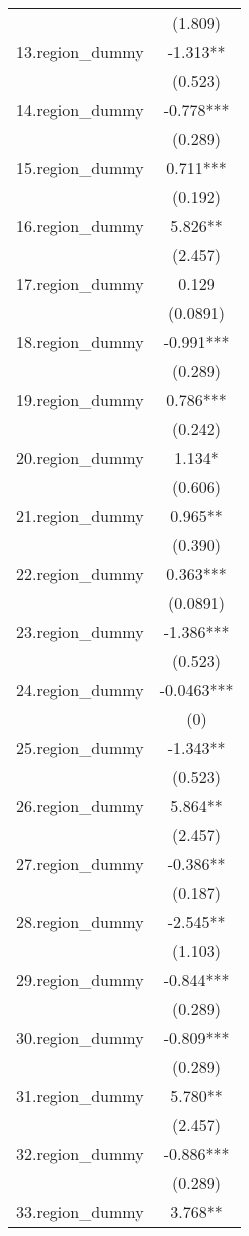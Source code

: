\documentclass[]{article}
\begin{document}
\begin{tabular}{lc}
 & (1.809) \\
13.region\_dummy & -1.313** \\
 & (0.523) \\
14.region\_dummy & -0.778*** \\
 & (0.289) \\
15.region\_dummy & 0.711*** \\
 & (0.192) \\
16.region\_dummy & 5.826** \\
 & (2.457) \\
17.region\_dummy & 0.129 \\
 & (0.0891) \\
18.region\_dummy & -0.991*** \\
 & (0.289) \\
19.region\_dummy & 0.786*** \\
 & (0.242) \\
20.region\_dummy & 1.134* \\
 & (0.606) \\
21.region\_dummy & 0.965** \\
 & (0.390) \\
22.region\_dummy & 0.363*** \\
 & (0.0891) \\
23.region\_dummy & -1.386*** \\
 & (0.523) \\
24.region\_dummy & -0.0463*** \\
 & (0) \\
25.region\_dummy & -1.343** \\
 & (0.523) \\
26.region\_dummy & 5.864** \\
 & (2.457) \\
27.region\_dummy & -0.386** \\
 & (0.187) \\
28.region\_dummy & -2.545** \\
 & (1.103) \\
29.region\_dummy & -0.844*** \\
 & (0.289) \\
30.region\_dummy & -0.809*** \\
 & (0.289) \\
31.region\_dummy & 5.780** \\
 & (2.457) \\
32.region\_dummy & -0.886*** \\
 & (0.289) \\
33.region\_dummy & 3.768** \\

\end{tabular}
\end{document}
